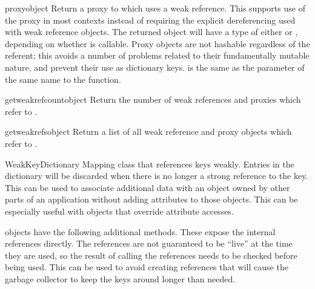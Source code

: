 \begin{funcdesc}{proxy}{object}
  Return a proxy to  which uses a weak reference.  This
  supports use of the proxy in most contexts instead of requiring the
  explicit dereferencing used with weak reference objects.  The
  returned object will have a type of either  or
  , depending on whether  is
  callable.  Proxy objects are not hashable regardless of the
  referent; this avoids a number of problems related to their
  fundamentally mutable nature, and prevent their use as dictionary
  keys.   is the same as the parameter of the same name
  to the  function.
\end{funcdesc}

\begin{funcdesc}{getweakrefcount}{object}
  Return the number of weak references and proxies which refer to
  .
\end{funcdesc}

\begin{funcdesc}{getweakrefs}{object}
  Return a list of all weak reference and proxy objects which refer to
  .
\end{funcdesc}

\begin{classdesc}{WeakKeyDictionary}{}
  Mapping class that references keys weakly.  Entries in the
  dictionary will be discarded when there is no longer a strong
  reference to the key.  This can be used to associate additional data
  with an object owned by other parts of an application without adding
  attributes to those objects.  This can be especially useful with
  objects that override attribute accesses.

\end{classdesc}

 objects have the following additional
methods.  These expose the internal references directly.  The
references are not guaranteed to be ``live'' at the time they are
used, so the result of calling the references needs to be checked
before being used.  This can be used to avoid creating references that
will cause the garbage collector to keep the keys around longer than
needed.

